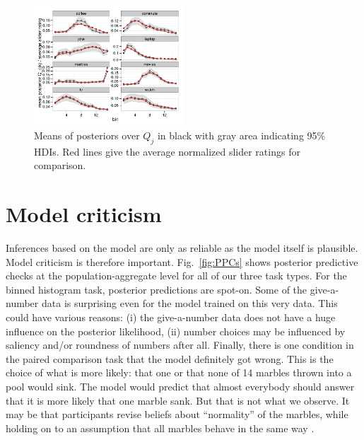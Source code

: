 \documentclass[10pt,letterpaper]{article}
\newcommand{\figref}[1]{Fig.~\ref{#1}}
\begin{document}
\begin{figure}
  \centering
  \includegraphics[width = 0.5\textwidth]{plots/pop_priors.pdf}
  \caption{Means of posteriors over $Q_j$ in black with gray area indicating 95\% HDIs. Red
    lines give the average normalized slider ratings for comparison.}
  \label{fig:PosteriorQj}
\end{figure}

\section{Model criticism}

Inferences based on the model are only as reliable as the model itself is plausible. Model
criticism is therefore important. \figref{fig:PPCs} shows posterior predictive checks at
the population-aggregate level for all of our three task types. For the binned histogram task,
posterior predictions are spot-on. Some of the give-a-number data is surprising even for
the model trained on this very data. This could have various reasons: (i) the give-a-number data does
not have a huge influence on the posterior likelihood, (ii) number choices may be influenced by
saliency and/or roundness of numbers after all. Finally, there is one condition in the paired
comparison task that the model definitely got wrong. This is the choice of what is more likely:
that one or that none of 14 marbles thrown into a pool would sink. The model would predict that
almost everybody should answer that it is more likely that one marble sank. But that is not
what we observe. It may be that participants revise beliefs about ``normality'' of the marbles,
while holding on to an assumption that all marbles behave in the same way 
\cite{DegenTessler2015:Wonky-worlds:-L}. 
\end{document}
